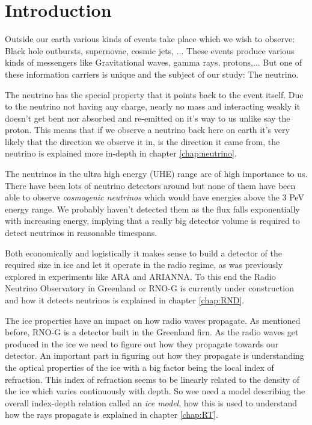 \chapter*{Introduction}
Outside our earth various kinds of events take place which we wish to 
observe: Black hole outbursts, supernovae, cosmic jets, ...
These events produce various kinds of messengers like 
Gravitational waves, gamma rays, protons,...
But one of these information carriers is unique and
the subject of our study: The neutrino. 

The neutrino has the special property that it points back to the event itself.
Due to the neutrino not having any charge, nearly no mass and 
interacting weakly it doesn't get bent nor absorbed and re-emitted 
on it's way to us unlike say the proton. This means that if we observe
a neutrino back here on earth it's very likely that the direction we observe
it in, is the direction it came from, the neutrino is explained more in-depth in chapter
\ref{chap:neutrino}.

The neutrinos in the ultra high energy (UHE) range are of high importance to us.
There have been lots of neutrino detectors around but none of them
have been able to observe \textit{cosmogenic neutrinos} which would have energies above
the 3 PeV energy range. We probably haven't detected them as the flux falls exponentially 
with increasing energy, implying that a really big detector volume is
required to detect neutrinos in reasonable timespans. 

Both economically and logistically it makes sense to build a detector of the
required size in ice and let it operate in the radio regime, as was previously
explored in experiments like ARA and ARIANNA.  To this end the Radio Neutrino
Observatory in Greenland or RNO-G is currently under construction and how it 
detects neutrinos is explained in chapter \ref{chap:RND}.

The ice properties have an impact on how radio waves propagate. As mentioned
before, RNO-G is a detector built in the Greenland firn. As the radio waves get
produced in the ice we need to figure out how they propagate towards our
detector. An important part in figuring out how they propagate is understanding
the optical properties of the ice with a big factor being the local index of
refraction. This index of refraction seems to be linearly related to the density of the ice which
varies continuously with depth. So wee need a model describing the overall index-depth relation
called an \textit{ice model}, how this is used to understand how the rays propagate
is explained in chapter \ref{chap:RT}.

